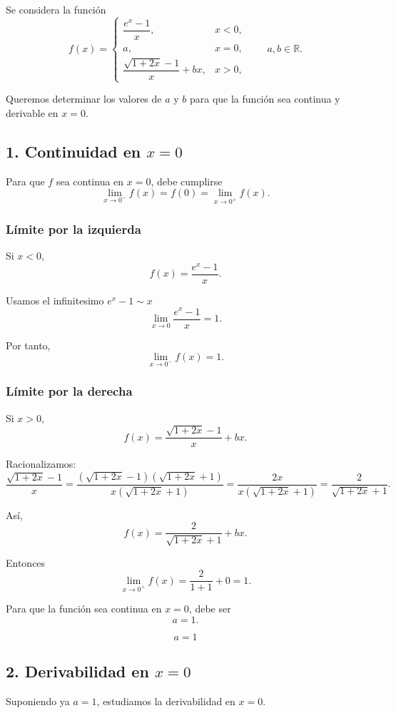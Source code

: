 \documentclass[12pt]{article}
\begin{document}
Se considera la función
\[
f(x)=
\begin{cases}
\dfrac{e^x-1}{x}, & x<0,\\[8pt]
a, & x=0,\\[8pt]
\dfrac{\sqrt{1+2x}-1}{x}+bx, & x>0,
\end{cases}
\qquad a,b\in\mathbb{R}.
\]

Queremos determinar los valores de \(a\) y \(b\) para que la función sea continua y derivable en \(x=0\).

\subsection*{1. Continuidad en \(x=0\)}

Para que \(f\) sea continua en \(x=0\), debe cumplirse
\[
\lim_{x\to 0^-}f(x)=f(0)=\lim_{x\to 0^+}f(x).
\]

\subsubsection*{Límite por la izquierda}

Si \(x<0\),
\[
f(x)=\frac{e^x-1}{x}.
\]

Usamos el infinitesimo $e^x-1 \sim x$
\[
\lim_{x\to 0}\frac{e^x-1}{x}=1.
\]

Por tanto,
\[
\lim_{x\to 0^-}f(x)=1.
\]

\subsubsection*{Límite por la derecha}

Si \(x>0\),
\[
f(x)=\frac{\sqrt{1+2x}-1}{x}+bx.
\]

Racionalizamos:
\[
\frac{\sqrt{1+2x}-1}{x}
=
\frac{(\sqrt{1+2x}-1)(\sqrt{1+2x}+1)}{x(\sqrt{1+2x}+1)}
=
\frac{2x}{x(\sqrt{1+2x}+1)}
=
\frac{2}{\sqrt{1+2x}+1}.
\]

Así,
\[
f(x)=\frac{2}{\sqrt{1+2x}+1}+bx.
\]

Entonces
\[
\lim_{x\to 0^+}f(x)
=
\frac{2}{1+1}+0
=
1.
\]

Para que la función sea continua en \(x=0\), debe ser
\[
a=1.
\]

\[
\boxed{a=1}
\]

\subsection*{2. Derivabilidad en \(x=0\)}

Suponiendo ya \(a=1\), estudiamos la derivabilidad en \(x=0\).
\end{document}
